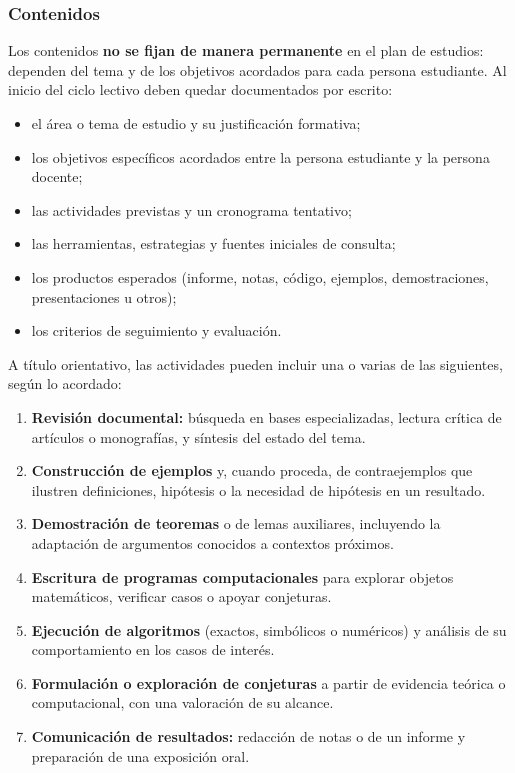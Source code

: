 \begin{refsection}
\subsubsection*{Contenidos}

Los contenidos \textbf{no se fijan de manera permanente} en el plan de estudios: dependen del tema y de los objetivos acordados para cada persona estudiante. Al inicio del ciclo lectivo deben quedar documentados por escrito:

\begin{itemize}
\item el área o tema de estudio y su justificación formativa;
\item los objetivos específicos acordados entre la persona estudiante y la persona docente;
\item las actividades previstas y un cronograma tentativo;
\item las herramientas, estrategias y fuentes iniciales de consulta;
\item los productos esperados (informe, notas, código, ejemplos, demostraciones, presentaciones u otros);
\item los criterios de seguimiento y evaluación.
\end{itemize}

A título orientativo, las actividades pueden incluir una o varias de las siguientes, según lo acordado:

\begin{enumerate}
\item \textbf{Revisión documental:} búsqueda en bases especializadas, lectura crítica de artículos o monografías, y síntesis del estado del tema.
\item \textbf{Construcción de ejemplos} y, cuando proceda, de contraejemplos que ilustren definiciones, hipótesis o la necesidad de hipótesis en un resultado.
\item \textbf{Demostración de teoremas} o de lemas auxiliares, incluyendo la adaptación de argumentos conocidos a contextos próximos.
\item \textbf{Escritura de programas computacionales} para explorar objetos matemáticos, verificar casos o apoyar conjeturas.
\item \textbf{Ejecución de algoritmos} (exactos, simbólicos o numéricos) y análisis de su comportamiento en los casos de interés.
\item \textbf{Formulación o exploración de conjeturas} a partir de evidencia teórica o computacional, con una valoración de su alcance.
\item \textbf{Comunicación de resultados:} redacción de notas o de un informe y preparación de una exposición oral.
\end{enumerate}


\end{refsection}

